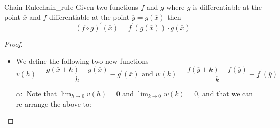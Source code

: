 \begin{theorem}{Chain Rule}{chain_rule}
    Given two functions $ f $ and $ g $ where $ g $ is differentiable at the point $ \overline{x}  $  and $ f $ differentiable at the point $ \overline{y} =  g\left( \overline{x}  \right)  $ then
    \[
    \left( f \circ g \right) ^{ \prime }  \left( \overline{x}  \right) =  f ^{ \prime } \left( g\left( \overline{x}  \right)  \right) \cdot g\left( \overline{x}  \right) 
    \]
\end{theorem}

\begin{proof}
    \begin{itemize}
        \item We define the following two new functions
            \[
            v\left( h \right) =  \frac{g\left( \overline{x} +  h \right) - g\left( \overline{x} \right) }{h} -  g ^{ \prime } \left( \overline{x} \right)  \text{ and } w\left( k \right) =  \frac{f\left( \overline{y}  +  k \right) -  f\left( \overline{y}  \right) }{k} -  f ^{ \prime } \left( \overline{y}  \right) 
            \]
        \item[$ \alpha: $] Note that $ \lim_{ h \to 0 } v\left( h \right) = 0 $ and $ \lim_{ k \to 0 } w\left( k \right)  = 0 $, and that we can re-arrange the above to:


\end{itemize}
\end{proof}
